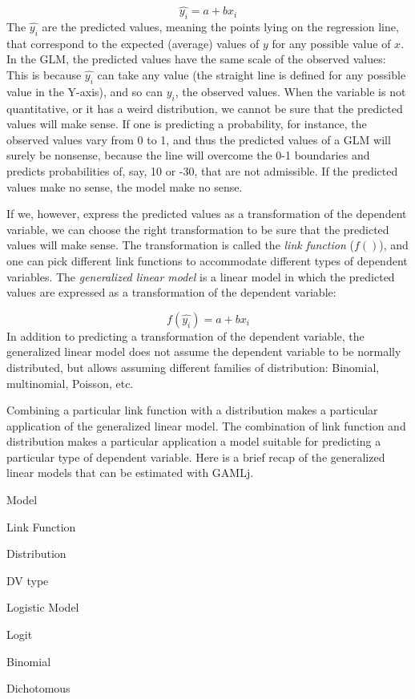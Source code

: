 \documentclass[
]{book}
\begin{document}
\[
\hat{y_i}=a+b x_i
\]
The \(\hat{y_i}\) are the predicted values, meaning the points lying on the regression line, that correspond to the expected (average) values of \(y\) for any possible value of \(x\). In the GLM, the predicted values have the same scale of the observed values: This is because \(\hat{y_i}\) can take any value (the straight line is defined for any possible value in the Y-axis), and so can \(y_i\), the observed values. When the variable is not quantitative, or it has a weird distribution, we cannot be sure that the predicted values will make sense. If one is predicting a probability, for instance, the observed values vary from 0 to 1, and thus the predicted values of a GLM will surely be nonsense, because the line will overcome the 0-1 boundaries and predicts probabilities of, say, 10 or -30, that are not admissible. If the predicted values make no sense, the model make no sense.

If we, however, express the predicted values as a transformation of the dependent variable, we can choose the right transformation to be sure that the predicted values will make sense. The transformation is called the \emph{link function} (\(f()\)), and one can pick different link functions to accommodate different types of dependent variables. The \emph{generalized linear model} is a linear model in which the predicted values are expressed as a transformation of the dependent variable:

\[
f(\hat{y_i})=a+b x_i
\]
In addition to predicting a transformation of the dependent variable, the generalized linear model does not assume the dependent variable to be normally distributed, but allows assuming different families of distribution: Binomial, multinomial, Poisson, etc.

Combining a particular link function with a distribution makes a particular application of the generalized linear model. The combination of link function and distribution makes a particular application a model suitable for predicting a particular type of dependent variable. Here is a brief recap of the generalized linear models that can be estimated with {GAMLj}.

Model

Link Function

Distribution

DV type

Logistic Model

Logit

Binomial

Dichotomous
\end{document}

